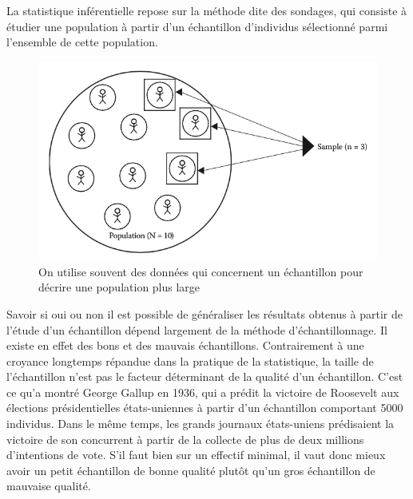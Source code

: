 \documentclass[
  french,
]{book}
\begin{document}
La statistique inférentielle repose sur la méthode dite des sondages, qui consiste à étudier une population à partir d'un échantillon d'individus sélectionné parmi l'ensemble de cette population.

\begin{figure}
\centering
\includegraphics{images/sample.png}
\caption{On utilise souvent des données qui concernent un échantillon pour décrire une population plus large}
\end{figure}

Savoir si oui ou non il est possible de généraliser les résultats obtenus à partir de l'étude d'un échantillon dépend largement de la méthode d'échantillonnage. Il existe en effet des bons et des mauvais échantillons. Contrairement à une croyance longtemps répandue dans la pratique de la statistique, la taille de l'échantillon n'est pas le facteur déterminant de la qualité d'un échantillon. C'est ce qu'a montré George Gallup en 1936, qui a prédit la victoire de Roosevelt aux élections présidentielles états-uniennes à partir d'un échantillon comportant 5000 individus. Dans le même temps, les grands journaux états-uniens prédisaient la victoire de son concurrent à partir de la collecte de plus de deux millions d'intentions de vote. S'il faut bien sur un effectif minimal, il vaut donc mieux avoir un petit échantillon de bonne qualité plutôt qu'un gros échantillon de mauvaise qualité.
\end{document}
